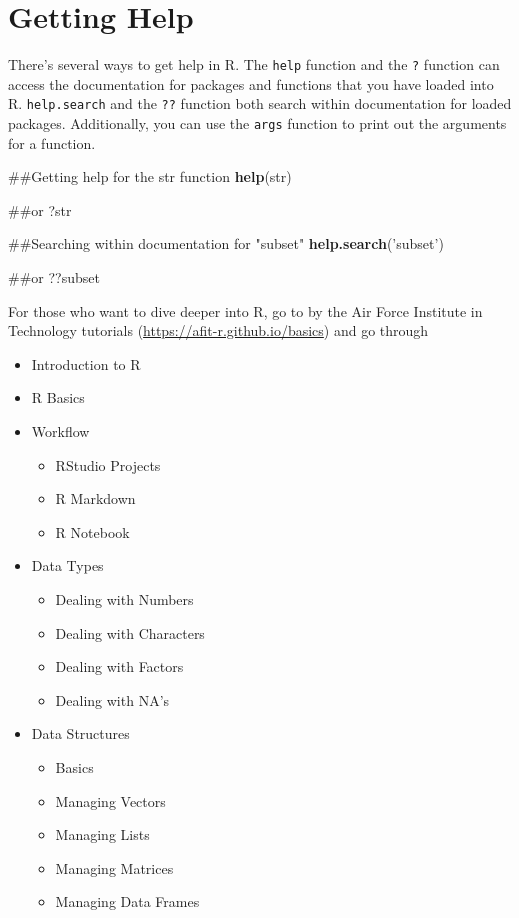 \documentclass[]{book}
\newenvironment{Shaded}{\begin{snugshade}}{\end{snugshade}}
\newcommand{\KeywordTok}[1]{\textcolor[rgb]{0.13,0.29,0.53}{\textbf{{#1}}}}
\newcommand{\StringTok}[1]{\textcolor[rgb]{0.31,0.60,0.02}{{#1}}}
\newcommand{\NormalTok}[1]{{#1}}
\providecommand{\tightlist}{%
  \setlength{\itemsep}{0pt}\setlength{\parskip}{0pt}}
\begin{document}
\section{Getting Help}\label{getting-help}

There's several ways to get help in R. The \texttt{help} function and
the \texttt{?} function can access the documentation for packages and
functions that you have loaded into R. \texttt{help.search} and the
\texttt{??} function both search within documentation for loaded
packages. Additionally, you can use the \texttt{args} function to print
out the arguments for a function.

\begin{Shaded}
\begin{Highlighting}[]
\NormalTok{##Getting help for the str function}
\KeywordTok{help}\NormalTok{(str)}

\NormalTok{##or}
\NormalTok{?str}

\NormalTok{##Searching within documentation for "subset"}
\KeywordTok{help.search}\NormalTok{(}\StringTok{'subset'}\NormalTok{)}

\NormalTok{##or}
\NormalTok{??subset}
\end{Highlighting}
\end{Shaded}

For those who want to dive deeper into R, go to by the Air Force
Institute in Technology tutorials
(\url{https://afit-r.github.io/basics}) and go through

\begin{itemize}
\tightlist
\item
  Introduction to R
\item
  R Basics
\item
  Workflow

  \begin{itemize}
  \tightlist
  \item
    RStudio Projects
  \item
    R Markdown
  \item
    R Notebook
  \end{itemize}
\item
  Data Types

  \begin{itemize}
  \tightlist
  \item
    Dealing with Numbers
  \item
    Dealing with Characters
  \item
    Dealing with Factors
  \item
    Dealing with NA's
  \end{itemize}
\item
  Data Structures

  \begin{itemize}
  \tightlist
  \item
    Basics
  \item
    Managing Vectors
  \item
    Managing Lists
  \item
    Managing Matrices
  \item
    Managing Data Frames
  \end{itemize}
\end{itemize}
\end{document}

